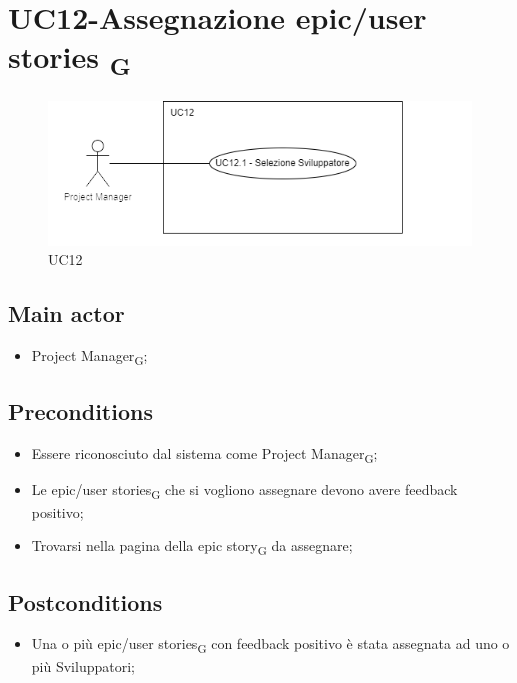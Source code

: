 \documentclass{article}
\begin{document}
\section{UC12-Assegnazione epic/user stories \textsubscript{G}}
    \begin{figure}[h]
      \centering
      \includegraphics{./imgUML/UC12.png}
    \caption{UC12}
      \label{fig:UC12}
    \end{figure}

    \subsection*{Main actor}
    \begin{itemize}
        \item Project Manager\textsubscript{G};
    \end{itemize}
    
    \subsection*{Preconditions}
        \begin{itemize}
            \item Essere riconosciuto dal sistema come Project Manager\textsubscript{G};
            \item Le epic/user stories\textsubscript{G} che si vogliono assegnare devono avere feedback positivo;
            \item Trovarsi nella pagina della epic story\textsubscript{G} da assegnare;
        \end{itemize}
        
    \subsection*{Postconditions}
        \begin{itemize}
            \item Una o più epic/user stories\textsubscript{G} con feedback positivo è stata assegnata ad uno o più Sviluppatori;
        \end{itemize}
    
\end{document}
